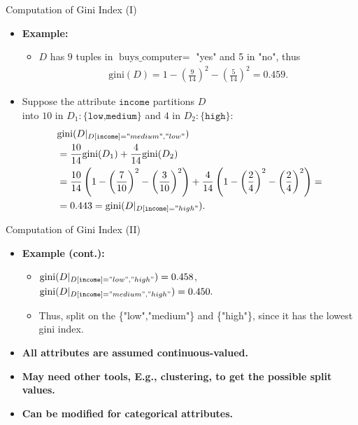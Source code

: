 \begin{frame}{Computation of Gini Index (I)}
  \begin{itemize}
  \item \textbf{Example:}
    \begin{itemize}
    \item $D$ has $9$ tuples in $\text{buys\_computer} =$ "yes" and 5 in "no", thus
      \begin{align}
        \text{gini}(D) = 1 - \left( \frac{9}{14} \right)^2 - \left( \frac{5}{14} \right)^2 = 0.459.
      \end{align}
    \end{itemize}
  \item Suppose the attribute $\texttt{income}$ partitions $D$ \\ into $10$ in $D_1:\{\texttt{low,medium}\}$ and $4$ in $D_2: \{\texttt{high}\}$:
    \begin{align}
      &\text{gini}(D\vert_{D[\texttt{income}]="medium", "low"}) \\
      &= \frac{10}{14} \text{gini}(D_1) + \frac{4}{14} \text{gini}(D_2)\\
      &=\frac{10}{14} \left(1-\left( \frac{7}{10} \right)^2 - \left( \frac{3}{10} \right)^2 \right) + \frac{4}{14} \left( 1-\left( \frac{2}{4} \right)^2 - \left( \frac{2}{4} \right)^2 \right) =\\
      &= 0.443 = \text{gini}(D\vert_{D[\texttt{income}]="high"}).
    \end{align}
  \end{itemize}
\end{frame}

\begin{frame}{Computation of Gini Index (II)}
  \begin{itemize}
  \item \textbf{Example (cont.):}
    \begin{itemize}
    \item $\text{gini}(D\vert_{D[\texttt{income}]="low", "high"}) = 0.458$,\\
      $\text{gini}(D\vert_{D[\texttt{income}]="medium", "high"}) = 0.450.$
    \item Thus, split on the \{"low","medium"\} and \{"high"\}, since it has the lowest gini index.
    \end{itemize}
  \item \textbf{All attributes are assumed continuous-valued.}
  \item \textbf{May need other tools, E.g., clustering, to get the possible split values.}
  \item \textbf{Can be modified for categorical attributes.}
  \end{itemize}
\end{frame}

